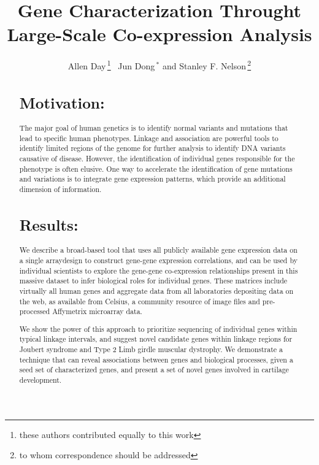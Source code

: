 \documentclass{bioinfo}
\begin{document}

\title[Co-expression Analysis]{Gene Characterization Throught Large-Scale Co-expression Analysis}
\author[Day \textit{et~al}]{Allen Day\,\footnote{these authors contributed equally to this work}~ Jun Dong\,$^{*}$ and Stanley F. Nelson\,\footnote{to whom correspondence should be addressed}}
\address{Department of Human Genetics, David Geffen School of Medicine, University of California, Los Angeles.}
\maketitle

\begin{abstract}

\section{Motivation:}
The major goal of human genetics is to identify normal variants and mutations
that lead to specific human phenotypes.  Linkage and association are powerful
tools to identify limited regions of the genome for further analysis to
identify DNA variants causative of disease.  However, the identification of
individual genes responsible for the phenotype is often elusive.  One way to
accelerate the identification of gene mutations and variations is to integrate
gene expression patterns, which provide an additional dimension of information.

\section{Results:}
We describe a broad-based tool that uses all publicly available gene expression
data on a single arraydesign to construct gene-gene expression correlations, and
can be used by individual scientists to explore the gene-gene co-expression
relationships present in this massive dataset to infer biological roles for
individual genes.  These matrices include virtually all human genes and
aggregate data from all laboratories depositing data on the web, as available
from Celsius, a community resource of image files and pre-processed Affymetrix
microarray data.

We show the power of this approach to prioritize sequencing of individual genes
within typical linkage intervals, and suggest novel candidate genes within
linkage regions for Joubert syndrome and Type 2 Limb girdle muscular dystrophy.
We demonstrate a technique that can reveal associations between genes and
biological processes, given a seed set of characterized genes, and present a
set of novel genes involved in cartilage development.


\end{abstract}
\end{document}
